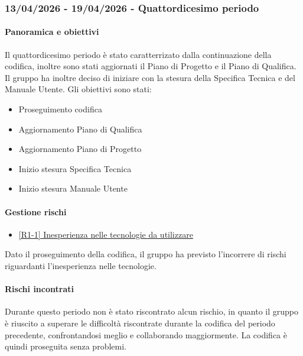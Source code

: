 \documentclass[a4paper,12pt]{article}
\begin{document}
        \subsubsection{13/04/2026 - 19/04/2026 - Quattordicesimo periodo}
            \paragraph{Panoramica e obiettivi}
            Il quattordicesimo periodo è stato caratterrizato dalla continuazione della codifica, inoltre sono stati aggiornati il Piano di Progetto e il Piano di Qualifica. Il gruppo ha inoltre deciso di iniziare con la stesura della Specifica Tecnica e del Manuale Utente. Gli obiettivi sono stati:
            \begin{itemize}
                \item Proseguimento codifica
                \item Aggiornamento Piano di Qualifica
                \item Aggiornamento Piano di Progetto
                \item Inizio stesura Specifica Tecnica
                \item Inizio stesura Manuale Utente
            \end{itemize}
            
            \paragraph{Gestione rischi}
                \begin{itemize}
                \item\hyperref[tab:r1]{[R1-1] Inesperienza nelle tecnologie da utilizzare}
                \end{itemize}
                Dato il proseguimento della codifica, il gruppo ha previsto l'incorrere di rischi riguardanti l'inesperienza nelle tecnologie.
    
                \paragraph*{Rischi incontrati}
                Durante questo periodo non è stato riscontrato alcun rischio, in quanto il gruppo è riuscito a superare le difficoltà riscontrate durante la codifica del periodo precedente, confrontandosi meglio e collaborando maggiormente.
                La codifica è quindi proseguita senza problemi.
                
\end{document}
